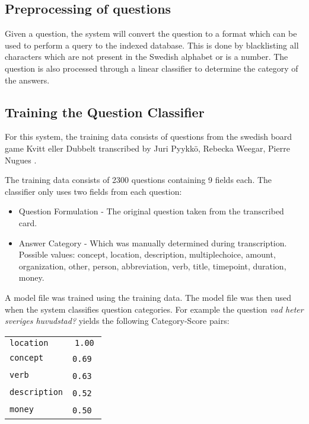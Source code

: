 \subsection{Preprocessing of questions}
Given a question, the system will convert the question
to a format which can be used to perform a query to the indexed
database. This is done by blacklisting all characters which
are not present in the Swedish alphabet or is a number. The question is also
processed through a linear classifier to determine the category of the 
answers.

\subsection{Training the Question Classifier}
For this system, the training data consists of questions 
from the swedish board game Kvitt eller Dubbelt transcribed 
by Juri Pyykk\"o, Rebecka Weegar, Pierre Nugues \cite{QASYS}.

The training data consists of 2300 questions containing 9 fields each.
The classifier only uses two fields from each question:
\begin{itemize}
\item Question Formulation - The original question taken from the transcribed
  card.
\item Answer Category - Which was manually determined during transcription. 
  Possible values: concept, location, description, multiplechoice, amount, organization, 
  other, person, abbreviation, verb, title, timepoint, duration, money.
\end{itemize}
A model file was trained using the training data. The model file was then used when the system 
classifies question categories. For example the question \textit{vad heter sveriges huvudstad?} 
yields the following Category-Score pairs:
\begin{center}
  \begin{tabular} {l c}
    \texttt{location}    & \texttt{1.00} \\
    \texttt{concept}     & \texttt{0.69} \\
    \texttt{verb}        & \texttt{0.63} \\
    \texttt{description} & \texttt{0.52} \\
    \texttt{money}       & \texttt{0.50} \\
  \end{tabular}
\end{center}

